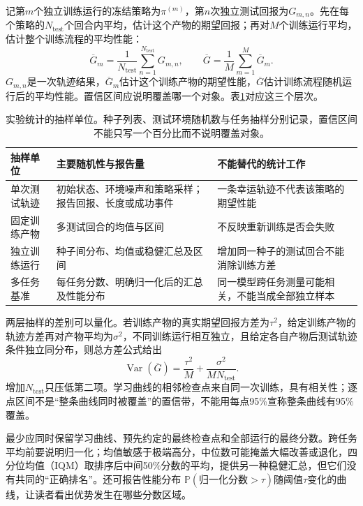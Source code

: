 记第$m$个独立训练运行的冻结策略为$\pi^{(m)}$，第$n$次独立测试回报为$G_{m,n}$。先在每个策略的$N_{\mathrm{test}}$个回合内平均，估计这个产物的期望回报；再对$M$个训练运行平均，估计整个训练流程的平均性能：
\[
 \overline G_m=\frac1{N_{\mathrm{test}}}
                    \sum_{n=1}^{N_{\mathrm{test}}}G_{m,n},\qquad
 \overline G=\frac1M\sum_{m=1}^{M}\overline G_m .
\]
$G_{m,n}$是一次轨迹结果，$\overline G_m$估计这个训练产物的期望性能，$\overline G$估计训练流程随机运行后的平均性能。置信区间应说明覆盖哪一个对象。表\ref{tab:rl-learning-statistical-units}对应这三个层次。

\begin{table}[t]
  \centering
  \small
  \begin{tabularx}{\linewidth}{>{\raggedright\arraybackslash}p{26mm} >{\raggedright\arraybackslash}X >{\raggedright\arraybackslash}X}
    \toprule
    抽样单位 & 主要随机性与报告量 & 不能替代的统计工作 \\
    \midrule
    单次测试轨迹 & 初始状态、环境噪声和策略采样；报告回报、长度或成功事件 & 一条幸运轨迹不代表该策略的期望性能 \\
    固定训练产物 & 多测试回合的均值与区间 & 不反映重新训练是否会失败 \\
    独立训练运行 & 种子间分布、均值或稳健汇总及区间 & 增加同一种子的测试回合不能消除训练方差 \\
    多任务基准 & 每任务分数、明确归一化后的汇总及性能分布 & 同一模型跨任务测量可能相关，不能当成全部独立样本 \\
    \bottomrule
  \end{tabularx}
  \caption{实验统计的抽样单位。种子列表、测试环境随机数与任务抽样分别记录，置信区间不能只写一个百分比而不说明覆盖对象。}
  \label{tab:rl-learning-statistical-units}
\end{table}

两层抽样的差别可以量化。若训练产物的真实期望回报方差为$\tau^2$，给定训练产物的轨迹方差再对产物平均为$\sigma^2$，不同训练运行相互独立，且给定各自产物后测试轨迹条件独立同分布，则总方差公式给出
\[
 \operatorname{Var}(\overline G)
   =\frac{\tau^2}{M}
      +\frac{\sigma^2}{M N_{\mathrm{test}}}.
\]
增加$N_{\mathrm{test}}$只压低第二项。学习曲线的相邻检查点来自同一次训练，具有相关性；逐点区间不是“整条曲线同时被覆盖”的置信带，不能用每点95\%宣称整条曲线有95\%覆盖。

最少应同时保留学习曲线、预先约定的最终检查点和全部运行的最终分数。跨任务平均前要说明归一化；均值敏感于极端高分，中位数可能掩盖大幅改善或退化，四分位均值（IQM）取排序后中间50\%分数的平均，提供另一种稳健汇总，但它们没有共同的“正确排名”。还可报告性能分布
$\mathbb P(\text{归一化分数}>\tau)$随阈值$\tau$变化的曲线，让读者看出优势发生在哪些分数区域。

